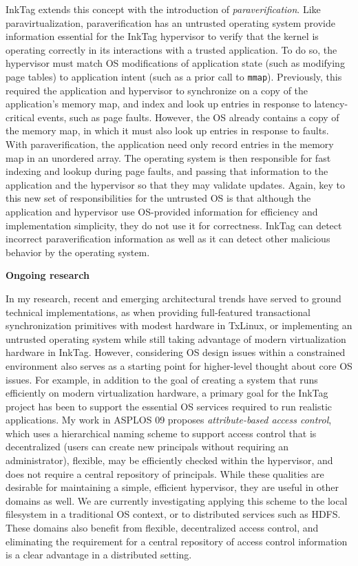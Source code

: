 \documentclass{article}
\newcommand{\inktag}{InkTag\xspace}
\newcommand{\codeid}[1]{{\fontsize{9pt}{12pt}\tt #1}}
\begin{document}
\inktag extends this concept with the introduction of
\emph{paraverification}. Like paravirtualization, paraverification has an
untrusted operating system provide information essential for the \inktag
hypervisor to verify that the kernel is operating correctly in its
interactions with a trusted application. To do so, the hypervisor must
match OS modifications of application state (such as modifying page tables) to
application intent (such as a prior call to \codeid{mmap}). Previously, this
required the application and hypervisor to synchronize on a copy of the
application's memory map, and index and look up entries in response to
latency-critical events, such as page faults. However, the OS already
contains a copy of the memory map, in which it must also look up entries in
response to faults. With paraverification, the application need only record
entries in the memory map in an unordered array. The operating system is
then responsible for fast indexing and lookup during page faults, and
passing that information to the application and the hypervisor so that they
may validate updates. Again, key to this new set of responsibilities for
the untrusted OS is that although the application and hypervisor use
OS-provided information for efficiency and implementation simplicity, they
do not use it for correctness. \inktag can detect incorrect
paraverification information as well as it can detect other malicious
behavior by the operating system.

{\bigskip \noindent \bf Ongoing research}

\noindent
In my research, recent and emerging architectural trends have served to
ground technical implementations, as when providing full-featured
transactional synchronization primitives with modest hardware in TxLinux,
or implementing an untrusted operating system while still taking advantage
of modern virtualization hardware in \inktag. However, considering OS
design issues within a constrained environment also serves as a starting
point for higher-level thought about core OS issues. For example, in
addition to the goal of creating a system that runs efficiently on modern
virtualization hardware, a primary goal for the \inktag project has been to
support the essential OS services required to run realistic applications.
My work in ASPLOS 09 proposes \emph{attribute-based access control}, which
uses a hierarchical naming scheme to support access control that is
decentralized (users can create new principals without requiring an
administrator), flexible, may be efficiently checked within the hypervisor,
and does not require a central repository of principals. While these
qualities are desirable for maintaining a simple, efficient hypervisor,
they are useful in other domains as well. We are currently investigating
applying this scheme to the local filesystem in a traditional OS context,
or to distributed services such as HDFS. These domains also benefit from
flexible, decentralized access control, and eliminating the requirement for
a central repository of access control information is a clear advantage in
a distributed setting.
\end{document}
